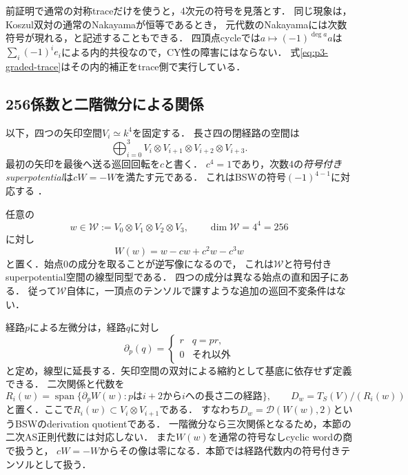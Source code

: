 \begin{remark}[通常の対称性とCY符号]
前証明で通常の対称traceだけを使うと，4次元の符号を見落とす．
同じ現象は，Koszul双対の通常のNakayamaが恒等であるとき，
元代数のNakayamaには次数符号が現れる，と記述することもできる．
四頂点cycleでは$a\mapsto(-1)^{\deg a}a$は
$\sum_i(-1)^ie_i$による内的共役なので，CY性の障害にはならない．
式\eqref{eq:p3-graded-trace}はその内的補正をtrace側で実行している．
\end{remark}

\subsection{256係数と二階微分による関係}

以下，四つの矢印空間$V_i\simeq k^4$を固定する．
長さ四の閉経路の空間は
\[
 \bigoplus_{i=0}^3V_i\otimes V_{i+1}\otimes V_{i+2}\otimes V_{i+3}.
\]
最初の矢印を最後へ送る巡回回転を$c$と書く．
$c^4=1$であり，次数4の\emph{符号付きsuperpotential}は$cW=-W$を満たす元である．
これはBSWの符号$(-1)^{4-1}$に対応する
\cite[\S1, equation~(1.3)]{BSWPotentials}．

任意の
\begin{equation}\label{eq:p3-potential-tensor}
 w\in\mathcal W:=V_0\otimes V_1\otimes V_2\otimes V_3,
 \qquad \dim\mathcal W=4^4=256
\end{equation}
に対し
\begin{equation}\label{eq:p3-signed-potential}
 W(w)=w-cw+c^2w-c^3w
\end{equation}
と置く．始点0の成分を取ることが逆写像になるので，
これは$\mathcal W$と符号付きsuperpotential空間の線型同型である．
四つの成分は異なる始点の直和因子にある．
従って$\mathcal W$自体に，一頂点のテンソルで課すような追加の巡回不変条件はない．

経路$p$による左微分は，経路$q$に対し
\[
 \partial_p(q)=
 \begin{cases}r&q=pr,\\0&\text{それ以外}\end{cases}
\]
と定め，線型に延長する．矢印空間の双対による縮約として基底に依存せず定義できる．
二次関係と代数を
\begin{equation}\label{eq:p3-derivation-quotient}
 R_i(w)=\operatorname{span}\{\partial_pW(w):
       p\text{は}i+2\text{から}i\text{への長さ二の経路}\},
 \qquad D_w=T_S(V)/(R_i(w))
\end{equation}
と置く．ここで$R_i(w)\subset V_i\otimes V_{i+1}$である．
すなわち$D_w=\mathcal D(W(w),2)$というBSWのderivation quotientである．
一階微分なら三次関係となるため，本節の二次AS正則代数には対応しない．
また$W(w)$を通常の符号なしcyclic wordの商で扱うと，
$cW=-W$からその像は零になる．本節では経路代数内の符号付きテンソルとして扱う．

